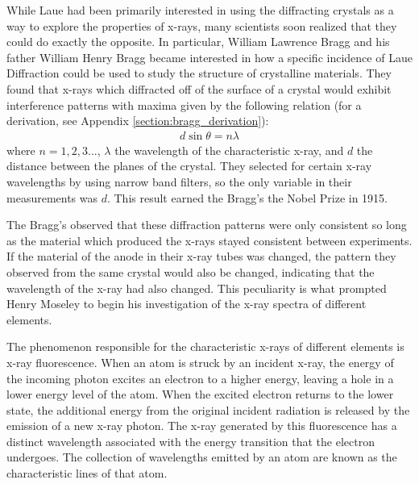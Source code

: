 \documentclass[%
 reprint,
 amsmath,amssymb,
 aps,
 pra,
]{revtex4-1}
\begin{document}
While Laue had been primarily interested in using the diffracting crystals as a way to explore the properties of x-rays, many scientists soon realized that they could do exactly the opposite. In particular, William Lawrence Bragg and his father William Henry Bragg became interested in how a specific incidence of Laue Diffraction could be used to study the structure of crystalline materials. They found that x-rays which diffracted off of the surface of a crystal would exhibit interference patterns with maxima given by the following relation (for a derivation, see Appendix \ref{section:bragg_derivation}):
\begin{gather}\label{eq:bragg}
	d\sin\theta = n \lambda
\end{gather}
where $n = 1,2,3...$, $\lambda$ the wavelength of the characteristic x-ray, and $d$ the distance between the planes of the crystal. They selected for certain x-ray wavelengths by using narrow band filters, so the only variable in their measurements was $d$. This result earned the Bragg's the Nobel Prize in 1915.

The Bragg's observed that these diffraction patterns were only consistent so long as the material which produced the x-rays stayed consistent between experiments. If the material of the anode in their x-ray tubes was changed, the pattern they observed from the same crystal would also be changed, indicating that the wavelength of the x-ray had also changed. This peculiarity is what prompted Henry Moseley to begin his investigation of the x-ray spectra of different elements\cite{xray_history, moseley}. %

The phenomenon responsible for the characteristic x-rays of different elements is x-ray fluorescence. When an atom is struck by an incident x-ray, the energy of the incoming photon excites an electron to a higher energy, leaving a hole in a lower energy level of the atom. When the excited electron returns to the lower state, the additional energy from the original incident radiation is released by the emission of a new x-ray photon. The x-ray generated by this fluorescence has a distinct wavelength associated with the energy transition that the electron undergoes. The collection of wavelengths emitted by an atom are known as the characteristic lines of that atom.
\end{document}
